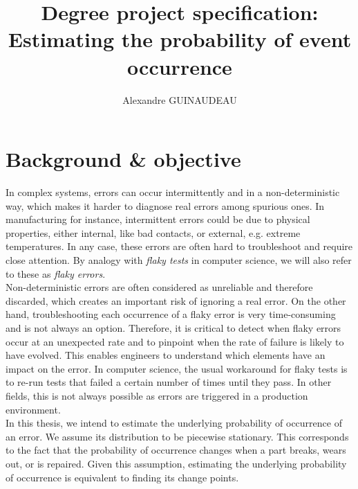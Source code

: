 \documentclass{kththesis}
\title{Degree project specification:\\
Estimating the probability of event occurrence}
\author{Alexandre GUINAUDEAU}
\begin{document}
\maketitle

\section{Background \& objective}

In complex systems, errors can occur intermittently and in a non-deterministic way, which makes it harder to diagnose real errors among spurious ones. 
In manufacturing for instance, intermittent errors could be due to physical properties, either internal, like bad contacts, or external, e.g. extreme temperatures.
In any case, these errors are often hard to troubleshoot and require close attention. By analogy with \emph{flaky tests} in computer science, we will also refer to these as \emph{flaky errors}.\\

Non-deterministic errors are often considered as unreliable and therefore discarded, which creates an important risk of ignoring a real error. On the other hand, troubleshooting each occurrence of a flaky error is very time-consuming and is not always an option. Therefore, it is critical to detect when flaky errors occur at an unexpected rate and to pinpoint when the rate of failure is likely to have evolved. This enables engineers to understand which elements have an impact on the error. In computer science, the usual workaround for flaky tests is to re-run tests that failed a certain number of times until they pass. In other fields, this is not always possible as errors are triggered in a production environment.\\

In this thesis, we intend to estimate the underlying probability of occurrence of an error.
We assume its distribution to be piecewise
stationary. This corresponds to the fact that the probability of
occurrence changes when a part breaks, wears out, or is repaired. Given this assumption, estimating the underlying probability of occurrence is
equivalent to finding its change points.
\end{document}
